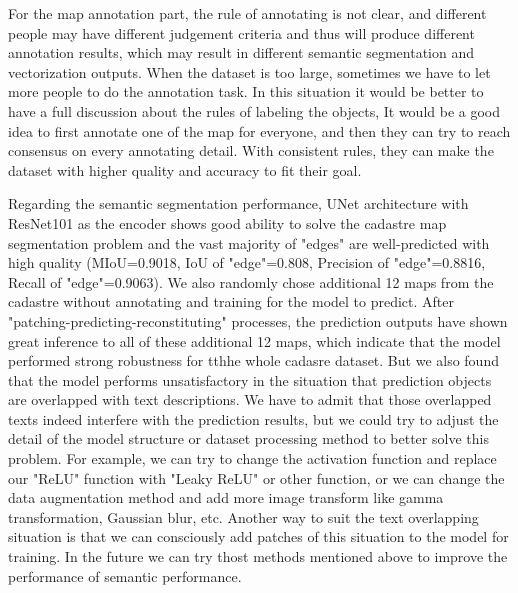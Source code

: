 \documentclass[12pt]{article}
\begin{document}
For the map annotation part, the rule of annotating is not clear, and different people may have different judgement criteria and thus will produce different annotation results, which may result in different semantic segmentation and vectorization outputs. When the dataset is too large, sometimes we have to let more people to do the annotation task. In this situation it would be better to have a full discussion about the rules of labeling the objects, It would be a good idea to first annotate one of the map for everyone, and then they can try to reach consensus on every annotating detail. With consistent rules, they can make the dataset with higher quality and accuracy to fit their goal. 

Regarding the semantic segmentation performance, UNet architecture with ResNet101 as the encoder shows good ability to solve the cadastre map segmentation problem and the vast majority of "edges" are well-predicted with high quality (MIoU=0.9018, IoU of "edge"=0.808, Precision of "edge"=0.8816, Recall of "edge"=0.9063). We also randomly chose additional 12 maps from the cadastre without annotating and training for the model to predict. After "patching-predicting-reconstituting" processes, the prediction outputs have shown great inference to all of these additional 12 maps, which indicate that the model performed strong robustness for tthhe whole cadasre dataset. But we also found that the model performs unsatisfactory in the situation that prediction objects are overlapped with text descriptions. We have to admit that those overlapped texts indeed interfere with the prediction results, but we could try to adjust the detail of the model structure or dataset processing method to better solve this problem. For example, we can try to change the activation function and replace our "ReLU" function with "Leaky ReLU" or other function, or we can change the data augmentation method and add more image transform like gamma transformation, Gaussian blur, etc. Another way to suit the text overlapping situation is that we can consciously add patches of this situation to the model for training. In the future we can try thost methods mentioned above to improve the performance of semantic performance.  
\end{document}
